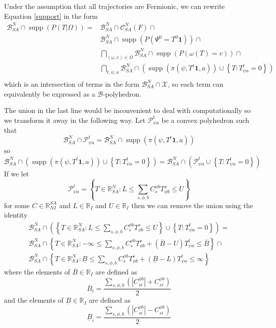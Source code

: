 \documentclass{article}
\DeclareMathOperator\supp{supp}
\begin{document}
Under the assumption that all trajectories are Fermionic, we can rewrite Equation \eqref{support} in the form
\begin{equation}
\begin{aligned}
\mathcal{B}^N_{SA} \cap \supp (P( T |\Omega)) = 
& \mathcal{B}^N_{SA} \cap \mathcal{C}^N_{SA}(F) \cap \\
& \mathcal{B}^N_{SA} \cap  \supp(P(\Psi^0 = T^0\mathbf{1})) \cap\\
& \bigcap_{(\omega,v) \in \Omega}   \mathcal{B}^N_{SA} \cap \supp\left(P\left(\omega(T)=v\right)\right) \cap \\
& \bigcap_{t,\psi, a}
\mathcal{B}^N_{SA} \cap \left(\supp\left(\pi(\psi,T^t\mathbf{1},a)\right)
\cup
\left\{T: T^t_{\psi a} = 0\right\}\right)
\\
\end{aligned}
\label{fermionicSupport}
\end{equation}
which is an intersection of terms in the form $\mathcal{B}^N_{SA} \cap \mathcal{X}$, so each term can equivalently be expressed as a $\mathcal{B}$-polyhedron.

The union in the last line would be inconvenient to deal with computationally so we transform it away in the following way. Let $\mathcal{P}^t_{\psi a}$ be a convex polyhedron such that
\[
\mathcal{B}^N_{SA} \cap \mathcal{P}^t_{\psi a} = \mathcal{B}^N_{SA} \cap \supp\left(\pi(\psi,T^t\mathbf{1},a)\right)
\]
so
\[
\mathcal{B}^N_{SA} \cap \left(\supp\left(\pi(\psi,T^t\mathbf{1},a)\right) \cup
\left\{T: T^t_{\psi a} = 0\right\}\right)
=
\mathcal{B}^N_{SA} \cap \left(\mathcal{P}^t_{\psi a} \cup \left\{T: T^t_{\psi a} = 0\right\}\right)
\]
If we let
\[
\mathcal{P}^t_{\psi a} = \left\{ T\in\mathbb{R}^N_{SA} : L \le \sum_{s,\phi,b} C^{\phi b}_{s} T^s_{\phi b} \le U \right\}
\]
for some $C \in \mathbb{R}^{SA}_{NI}$ and $L\in\mathbb{R}_I$ and $U\in\mathbb{R}_I$ then we can remove the union using the identity
\begin{multline}
\mathcal{B}^N_{SA} \cap
\left(
\left\{ T\in\mathbb{R}^N_{SA} : L \le \sum_{s,\phi,b} C^{\phi b}_{s} T^s_{\phi b} \le U \right\}
\cup
\left\{T: T^t_{\psi a} = 0\right\}\right)
=\\
\mathcal{B}^N_{SA} \cap
\left\{
T\in\mathbb{R}^N_{SA}:
-\infty \le \sum_{s,\phi,b} C^{\phi b}_{s} T^s_{\phi b}
+
(\overline{B}-U)T^{t}_{\psi a}
\le \overline{B}
\right\}
\cap\\
\mathcal{B}^N_{SA} \cap
\left\{
T\in\mathbb{R}^N_{SA}:
\underline{B} \le \sum_{s,\phi,b} C^{\phi b}_{s} T^s_{\phi b}
+
(\underline{B}-L)T^{t}_{\psi a} \le \infty
\right\}
\label{implication}
\end{multline}
where the elements of $\overline{B}\in\mathbb{R}_I$ are defined as
\[
\overline{B}_i = \frac{\sum_{s,\phi,b} \left( |C^{\phi b}_{si}| + C^{\phi b}_{si}\right)}{2}
\]
and the elements of $\underline{B}\in\mathbb{R}_I$ are defined as
\[
\underline{B}_i = \frac{\sum_{s,\phi,b} \left( |C^{\phi b}_{si}| - C^{\phi b}_{si}\right)}{2}
\]
\end{document}
